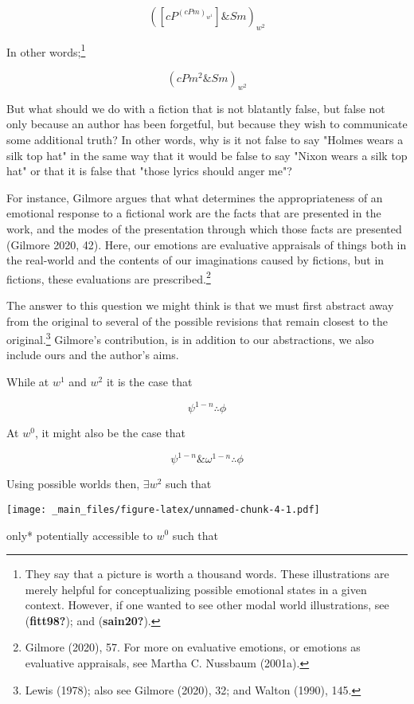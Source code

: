 \documentclass[12pt]{book}
\theoremstyle{definition}
\theoremstyle{remark}
\newcommand{\pandocbounded}[1]{#1}
\begin{document}
\[([cP^{( cPm )_{w^{1}}}] \& Sm)_{w^{2}}\]

In other words;\footnote{They say that a picture is worth a thousand words. These illustrations are merely helpful for conceptualizing possible emotional states in a given context. However, if one wanted to see other modal world illustrations, see (\textbf{fitt98?}); and (\textbf{sain20?}).}

\[( cPm^{2} \& Sm )_{w^{2}}\]

But what should we do with a fiction that is not blatantly false, but false not only because an author has been forgetful, but because they wish to communicate some additional truth? In other words, why is it not false to say "Holmes wears a silk top hat" in the same way that it would be false to say "Nixon wears a silk top hat" or that it is false that "those lyrics should anger me"?

For instance, Gilmore argues that what determines the appropriateness of an emotional response to a fictional work are the facts that are presented in the work, and the modes of the presentation through which those facts are presented (Gilmore 2020, 42). Here, our emotions are evaluative appraisals of things both in the real-world and the contents of our imaginations caused by fictions, but in fictions, these evaluations are prescribed.\footnote{Gilmore (2020), 57. For more on evaluative emotions, or emotions as evaluative appraisals, see Martha C. Nussbaum (2001a).}

\noindent The answer to this question we might think is that we must first abstract away from the original to several of the possible revisions that remain closest to the original.\footnote{Lewis (1978); also see Gilmore (2020), 32; and Walton (1990), 145.} Gilmore's contribution, is in addition to our abstractions, we also include ours and the author's aims.

While at \(w^{1}\) and \(w^{2}\) it is the case that

\[\psi^{1-n}\therefore\phi\]

\noindent At \(w^{0}\), it might also be the case that

\[\psi^{1-n}\&\omega^{1-n}\therefore\phi\]

\newpage

\noindent Using possible worlds then, \(\exists w^{2}\) such that

\pandocbounded{\texttt{[image: \_main\_files/figure-latex/unnamed-chunk-4-1.pdf]}}

\noindent *only* potentially accessible to \(w^{0}\) such that
\end{document}
